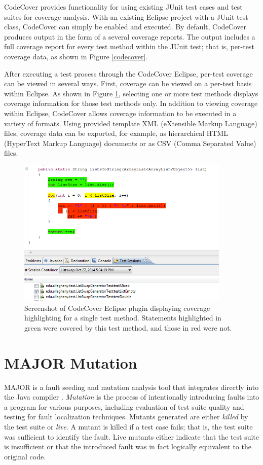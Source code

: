 CodeCover provides functionality for using existing JUnit test cases and
test suites for coverage analysis. With an existing Eclipse project with 
a JUnit test class, CodeCover can simply be enabled and executed.  By 
default, CodeCover produces output in the form of a several coverage
reports.  The output includes a full coverage report for every test method 
within the JUnit test; that is, per-test coverage data, as shown in Figure
\ref{codecover}.  

After executing a test process through the CodeCover Eclipse, per-test
coverage can be viewed in several ways.  First, coverage can be viewed on 
a per-test basis within Eclipse.  As shown in Figure \ref{codecoverage}, 
selecting one or more test methods displays coverage information for those
test methods only.  In addition to viewing coverage within Eclipse, CodeCover
allows coverage information to be executed in a variety of formats.  Using
provided template XML (eXtensible Markup Language) files, coverage data can be exported, for example, as
hierarchical HTML (HyperText Markup Language) documents or as CSV (Comma Separated Value) files.  

\begin{figure}[tpb]
  \centering
  \includegraphics[width=4in]{img/codecovercoverage.png}
  \caption{Screenshot of CodeCover Eclipse plugin displaying coverage
  highlighting for a single test method.  Statements highlighted in green
  were covered by this test method, and those in red were not.}
  \label{codecoverage}
\end{figure}

\section{MAJOR Mutation}\label{sec:major}

MAJOR is a fault seeding and mutation analysis tool that integrates
directly into the Java compiler \cite{major}. \emph{Mutation} is the process of
intentionally introducing faults into a program for various purposes,
including evaluation of test suite quality and testing for fault
localization techniques.  Mutants generated are either \emph{killed} by
the test suite or \emph{live}.  A mutant is killed if a test case fails;
that is, the test suite was sufficient to identify the fault.  Live
mutants either indicate that the test suite is insufficient or that the
introduced fault was in fact logically equivalent to the original code.

